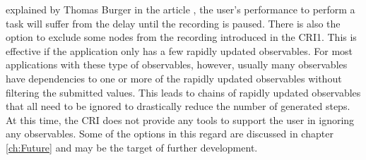 explained by Thomas Burger in the article \cite{Perception}, the user's performance to perform a task will suffer from the delay until the recording is paused.
There is also the option to exclude some nodes from the recording introduced in the CRI1. This is effective if the application only has a few rapidly updated observables. For most applications with these type of observables, however, usually many observables have dependencies to one or more of the rapidly updated observables without filtering the submitted values. This leads to chains of rapidly updated observables that all need to be ignored to drastically reduce the number of generated steps. At this time, the CRI does not provide any tools to support the user in ignoring any observables. Some of the options in this regard are discussed in chapter \ref{ch:Future} and may be the target of further development.

